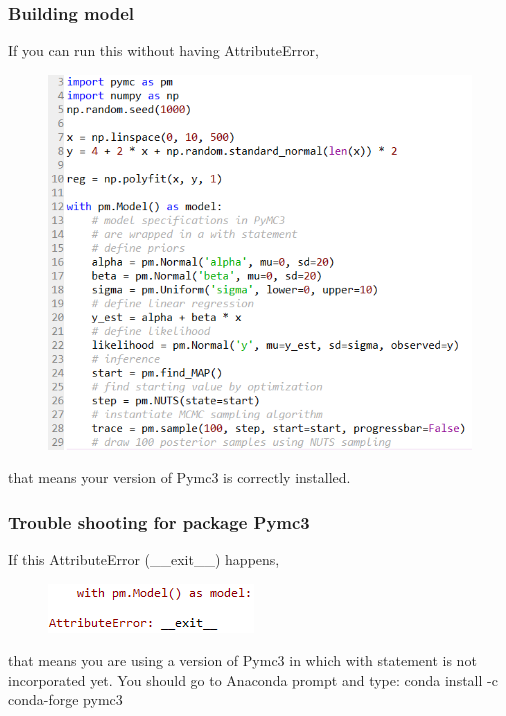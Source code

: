 \documentclass{beamer}
\begin{document}
\begin{frame}
\frametitle{Building model}
If you can run this without having AttributeError,
\begin{figure}[H]
	\includegraphics[scale=0.43]{bayesian_building_model.png}
\end{figure}
that means your version of Pymc3 is correctly installed.
\end{frame}

\begin{frame}
\frametitle{Trouble shooting for package Pymc3}
If this AttributeError (\_\_exit\_\_) happens,
\begin{figure}[H]
	\includegraphics[scale=0.7]{pymc_error_3.png}
\end{figure}
that means you are using a version of Pymc3 in which with statement is not incorporated yet. You should go to Anaconda prompt and type:
conda install -c conda-forge pymc3
\end{frame}
\end{document}
